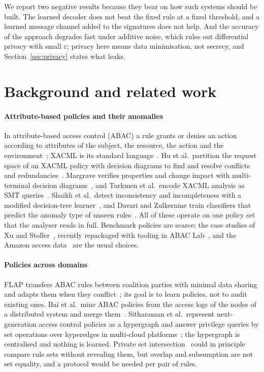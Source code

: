 \documentclass[preprint,12pt]{elsarticle}
\theoremstyle{definition}
\begin{document}
We report two negative results because they bear on how such systems should be built. The learned decoder does not beat the fixed rule at a fixed threshold, and a learned message channel added to the signatures does not help. And the accuracy of the approach degrades fast under additive noise, which rules out differential privacy with small $\varepsilon$; privacy here means data minimisation, not secrecy, and Section~\ref{sec:privacy} states what leaks.

\section{Background and related work}
\label{sec:related}

\paragraph{Attribute-based policies and their anomalies}
In attribute-based access control (ABAC) a rule grants or denies an action according to attributes of the subject, the resource, the action and the environment~\cite{hu2014abac}; XACML is its standard language~\cite{oasis2013xacml}. Hu et al.\ partition the request space of an XACML policy with decision diagrams to find and resolve conflicts and redundancies~\cite{hu2013discovery}. Margrave verifies properties and change impact with multi-terminal decision diagrams~\cite{fisler2005margrave}, and Turkmen et al.\ encode XACML analysis as SMT queries~\cite{turkmen2017formal}. Shaikh et al.\ detect inconsistency and incompleteness with a modified decision-tree learner~\cite{shaikh2017data}, and Davari and Zulkernine train classifiers that predict the anomaly type of unseen rules~\cite{davari2023classification}. All of these operate on one policy set that the analyser reads in full. Benchmark policies are scarce; the case studies of Xu and Stoller~\cite{xu2015mining}, recently repackaged with tooling in ABAC Lab~\cite{bui2025abaclab}, and the Amazon access data~\cite{amazon2013access} are the usual choices.

\paragraph{Policies across domains}
FLAP transfers ABAC rules between coalition parties with minimal data sharing and adapts them when they conflict~\cite{abujabal2020flap}; its goal is to learn policies, not to audit existing ones. Bai et al.\ mine ABAC policies from the access logs of the nodes of a distributed system and merge them~\cite{bai2025enhancing}. Sitharaman et al.\ represent next-generation access control policies as a hypergraph and answer privilege queries by set operations over hyperedges in multi-cloud platforms~\cite{sitharaman2025scalable}; the hypergraph is centralised and nothing is learned. Private set intersection~\cite{freedman2004efficient} could in principle compare rule sets without revealing them, but overlap and subsumption are not set equality, and a protocol would be needed per pair of rules.
\end{document}
